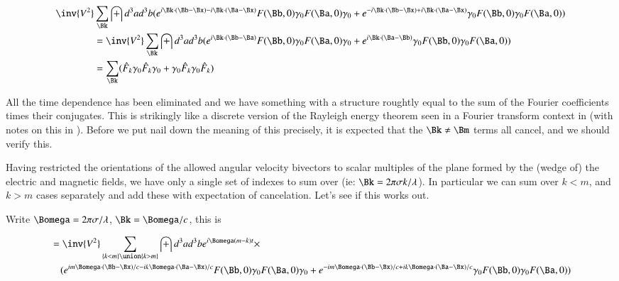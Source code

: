 \documentclass{article}
\begin{document}
\begin{align*}
\inv{V^2} &\sum_{\Bk} \int d^3 a d^3 b (e^{   i \Bk \cdot (\Bb-\Bx) - i \Bk \cdot (\Ba-\Bx) } F(\Bb, 0) \gamma_0 F(\Ba, 0) \gamma_0  
+e^{ - i \Bk \cdot (\Bb-\Bx) + i \Bk \cdot (\Ba-\Bx) } \gamma_0 F(\Bb, 0) \gamma_0 F(\Ba, 0)) \\
&=
\inv{V^2} \sum_{\Bk} \int d^3 a d^3 b (e^{   i \Bk \cdot (\Bb - \Ba) } F(\Bb, 0) \gamma_0 F(\Ba, 0) \gamma_0  
+e^{ i \Bk \cdot (\Ba -\Bb) } \gamma_0 F(\Bb, 0) \gamma_0 F(\Ba, 0)) \\
&=
\sum_{\Bk} ( \hat{F}_k \gamma_0 \hat{F}_k \gamma_0 + \gamma_0 \hat{F}_k \gamma_0 \hat{F}_k ) \\
\end{align*}

All the time dependence has been eliminated and we have something with a structure roughtly equal to the sum of the Fourier coefficients 
times their conjugates.  This is strikingly like a discrete version of the Rayleigh energy theorem seen in 
a Fourier transform context in \cite{haykin1994cs} (with notes on this in \cite{PJqmFourier}).
Before we put nail down the meaning of this precisely, it is expected that 
the $\Bk \ne \Bm$ terms all cancel, and we should verify this.

Having restricted the orientations of the allowed angular velocity bivectors to scalar multiples of the plane formed by the (wedge of) the electric 
and magnetic fields, we have only a single set of indexes to sum over (ie: $\Bk = 2 \pi \sigma k/ \lambda$).
In particular we can sum over $k < m$, and $k > m$ cases separately and add these
with expectation of cancelation.  Let's see if this works out.

Write $\Bomega = 2 \pi \sigma / \lambda$, $\Bk = \Bomega/c$, this is

\begin{align*}
&=\inv{V^2} \sum_{\{k <m\} \union \{ k > m \}} \int d^3 a d^3 b e^{i \Bomega (m -k) t } \times \\
&\quad (e^{   i m \Bomega \cdot (\Bb-\Bx)/c - i k \Bomega \cdot (\Ba-\Bx)/c } F(\Bb, 0) \gamma_0 F(\Ba, 0) \gamma_0  
+e^{ - i m \Bomega \cdot (\Bb-\Bx)/c + i k \Bomega \cdot (\Ba-\Bx)/c } \gamma_0 F(\Bb, 0) \gamma_0 F(\Ba, 0))
\end{align*}



\end{document}
